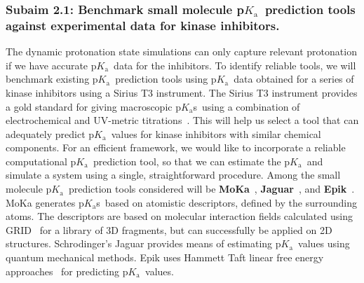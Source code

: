 \documentclass[10pt,final]{article}
\newcommand{\pKa}{p$K_\mathrm{a}$\ }
\newcommand{\pKas}{p$K_\mathrm{a}$s\ }
\begin{document}
\subsubsection*{Subaim 2.1: Benchmark small molecule \pKa prediction tools against experimental data for kinase inhibitors.}
The dynamic protonation state simulations can only capture relevant protonation if we have accurate \pKa data for the inhibitors.
%
To identify reliable tools, we will benchmark existing \pKa prediction tools using \pKa data obtained for a series of kinase inhibitors using a Sirius T3 instrument.
%
The Sirius T3 instrument provides a gold standard for giving macroscopic \pKas using a combination of electrochemical and UV-metric titrations~\autocite{Schoenherr2015a}.
%
This will help us select a tool that can adequately predict \pKa values for kinase inhibitors with similar chemical components.
%
For an efficient framework, we would like to incorporate a reliable computational \pKa prediction tool, so that we can estimate the \pKa and simulate a system using a single, straightforward procedure.
%
Among the small molecule \pKa prediction tools considered will be \textbf{MoKa}~\autocite{Milletti2007a}, \textbf{Jaguar}~\autocite{Bochevarov2013a}, and \textbf{Epik}~\autocite{Shelley2007a,Greenwood2010a}.
%
MoKa generates \pKas based on atomistic descriptors, defined by the surrounding atoms.
%
The descriptors are based on molecular interaction fields calculated using GRID~\autocite{Goodford1985a} for a library of 3D fragments, but can successfully be applied on 2D structures.
%
Schrodinger's Jaguar provides means of estimating \pKa values using quantum mechanical methods.
%
Epik uses Hammett Taft linear free energy approaches~\autocite{Perrin1981a} for predicting \pKa values.
\end{document}
